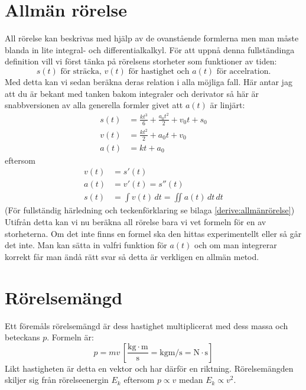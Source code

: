 \section{Allmän rörelse}
All rörelse kan beskrivas med hjälp av de ovanstående formlerna men man måste blanda in lite integral- och differentialkalkyl. För att uppnå denna fullständinga definition vill vi först tänka på rörelsens storheter som funktioner av tiden:
\begin{equation*}
    s(t) \text{ för sträcka, } v(t) \text{ för hastighet och } a(t) \text{ för accelration.}
\end{equation*}
Med detta kan vi sedan beräkna deras relation i alla möjliga fall. Här antar jag att du är bekant med tanken bakom integraler och derivator så här är snabbversionen av alla generella formler givet att $a(t)$ är linjärt:
\begin{align*}
    s(t) &= \frac{kt^3}{6} + \frac{a_0t^2}{2} + v_0t + s_0 \\
    v(t) &= \frac{kt^2}{2} + a_0t + v_0 \\
    a(t) &= kt + a_0
\end{align*}
eftersom
\begin{align*}
    v(t) &= s'(t) \\
    a(t) &= v'(t) = s''(t) \\
    s(t) &= \hyperref[def:indefint]{\int} {v(t)}\, dt = \iint{a(t)}\, dt\, dt
\end{align*}
(För fullständig härledning och teckenförklaring se bilaga \ref{derive:allmänrörelse}) Utifrån detta kan vi nu beräkna all rörelse bara vi vet formeln för en av storheterna. Om det inte finns en formel ska den hittas experimentellt eller så går det inte. Man kan sätta in valfri funktion för $a(t)$ och om man integrerar korrekt får man ändå rätt svar så detta är verkligen en allmän metod.

\section{Rörelsemängd}
Ett föremåls rörelsemängd är dess hastighet multiplicerat med dess massa och beteckans $p$. Formeln är: \[ p = mv\, \left[\mathrm{\frac{kg \cdot m}{s}  = kgm/s = N \cdot s}\right]\] Likt hastigheten är detta en vektor och har därför en riktning. Rörelsemängden skiljer sig från rörelseenergin $E_k$ eftersom $p \hyperref[def:propto]{\propto} v$ medan $E_k \propto v^2$.
